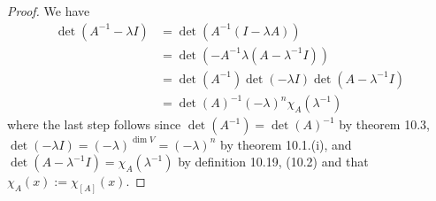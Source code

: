 \documentclass[reqno]{amsart}
\theoremstyle{definition}
\theoremstyle{remark}
\begin{document}
    \begin{proof}
        We have
        \begin{align*}
            \det \left( A^{-1} - \lambda I \right) 
            &= \det \left( A^{-1} \left( 
            I - \lambda A \right)  \right) \\
            &= \det \left( - A^{-1} \lambda 
            \left( A - \lambda^{-1} I  \right) \right) \\
            &= \det (A^{-1}) \det (- \lambda I) \det
            \left( A - \lambda^{-1} I \right) \tag{Thm 10.1.(ii)}\\
            &= \det(A)^{-1} \left( - \lambda \right)^{n}
            \chi_{A}\left( \lambda^{-1} \right) 
        \end{align*}
        where the last step follows since
        $\det \left( A^{-1} \right) =
        \det (A)^{-1}$ by theorem 10.3,
        $\det \left( - \lambda I \right) 
        = \left( - \lambda \right)^{\dim V}=
        \left( - \lambda \right)^{n}$ by
        theorem 10.1.(i), and
        $\det \left( A - \lambda^{-1}I \right) 
        = \chi_{A} (\lambda^{-1})$ by definition
        10.19, (10.2) and that
        $\chi_A (x) := \chi_{\left[ A \right] }(x)$.
    \end{proof}
    









\end{document}

